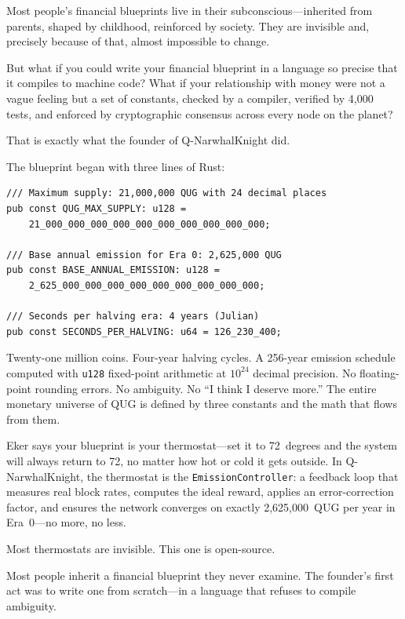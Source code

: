 \documentclass[11pt,a4paper]{article}
\begin{document}
\vspace{0.3cm}

Most people's financial blueprints live in their subconscious---inherited
from parents, shaped by childhood, reinforced by society. They are invisible
and, precisely because of that, almost impossible to change.

But what if you could write your financial blueprint in a language so
precise that it compiles to machine code? What if your relationship with
money were not a vague feeling but a set of constants, checked by a
compiler, verified by 4{,}000 tests, and enforced by cryptographic
consensus across every node on the planet?

That is exactly what the founder of Q-NarwhalKnight did.

The blueprint began with three lines of Rust:

\begin{lstlisting}[caption={The Financial Blueprint in Code (\texttt{emission\_controller.rs})}]
/// Maximum supply: 21,000,000 QUG with 24 decimal places
pub const QUG_MAX_SUPPLY: u128 =
    21_000_000_000_000_000_000_000_000_000_000;

/// Base annual emission for Era 0: 2,625,000 QUG
pub const BASE_ANNUAL_EMISSION: u128 =
    2_625_000_000_000_000_000_000_000_000_000;

/// Seconds per halving era: 4 years (Julian)
pub const SECONDS_PER_HALVING: u64 = 126_230_400;
\end{lstlisting}

Twenty-one million coins. Four-year halving cycles. A 256-year emission
schedule computed with \texttt{u128} fixed-point arithmetic at $10^{24}$
decimal precision. No floating-point rounding errors. No ambiguity. No
``I think I deserve more.'' The entire monetary universe of QUG is
defined by three constants and the math that flows from them.

Eker says your blueprint is your thermostat---set it to 72~degrees and
the system will always return to 72, no matter how hot or cold it gets
outside. In Q-NarwhalKnight, the thermostat is the
\texttt{EmissionController}: a feedback loop that measures real block
rates, computes the ideal reward, applies an error-correction factor,
and ensures the network converges on exactly 2{,}625{,}000~QUG per year
in Era~0---no more, no less.

Most thermostats are invisible. This one is open-source.

\begin{principle}[title={\textbf{The Principle}}]
Most people inherit a financial blueprint they never examine.
The founder's first act was to write one from scratch---in a language
that refuses to compile ambiguity.
\end{principle}
\end{document}

